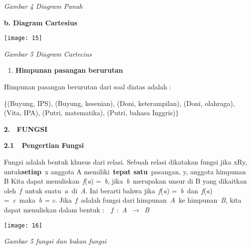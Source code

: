 \documentclass[11pt,fleqn]{book} %
\begin{document}
\begin{myEnumerate}
\begin{itemize}
\noindent 

\noindent 

\noindent \textit{Gambar 4 Diagram Panah}

\noindent \textbf{b. Diagram Cartesius}

\begin{center}
\noindent \texttt{[image: 15]}
\end{center}

\noindent \textit{Gambar 5 Diagram Cartecius}

\noindent \textbf{}

\begin{enumerate}
\item \textbf{ Himpunan pasangan berurutan}
\end{enumerate}

\noindent Himpunan pasangan berurutan dari soal diatas adalah :

\noindent 

\noindent $\{$(Buyung, IPS), (Buyung, kesenian), (Doni, keterampilan), (Doni, olahraga), (Vita, IPA), (Putri, matematika), (Putri, bahasa Inggris)$\}$

\noindent 

\noindent 

\noindent \eject 

\noindent \textbf{2.}~~\textbf{FUNGSI}

\noindent \textbf{2.1~~Pengertian Fungsi}

\noindent \textbf{}

Fungsi adalah bentuk khusus dari relasi. Sebuah relasi dikatakan fungsi jika xRy, untuk\textbf{setiap}~x anggota A memiliki~\textbf{tepat satu}~pasangan, y, anggota himpunan B Kita dapat menuliskan~\textit{f}(\textit{a}) =~\textit{b}, jika~\textit{b~}merupakan unsur di B yang dikaitkan oleh~\textit{f~}untuk suatu~\textit{a~}di~\textit{A}. Ini berarti bahwa jika~\textit{f}(\textit{a}) =~\textit{b~}dan~\textit{f}(\textit{a}) =~\textit{c~}maka~\textit{b = c}. Jika~\textit{f~}adalah fungsi dari himpunan~\textit{A~}ke himpunan~\textit{B}, kita dapat menuliskan dalam bentuk :~~\textit{f~}:~\textit{A~}$\mathrm{\to}$~\textit{B}

\noindent 

\begin{center}
\noindent \texttt{[image: 16]}
\end{center}

\noindent \textit{Gambar 5 fungsi dan bukan fungsi}


\end{itemize}
\end{myEnumerate}
\end{document}
